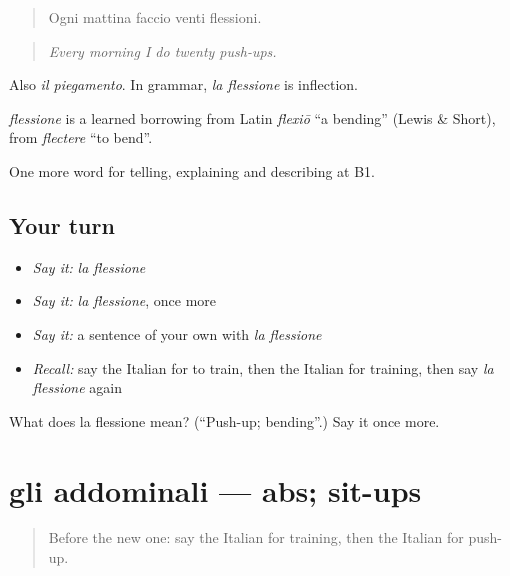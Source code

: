 \begin{quote}
Ogni mattina faccio venti flessioni.
\end{quote}

\begin{quote}
\emph{Every morning I do twenty push-ups.}
\end{quote}

Also \emph{il piegamento}. In grammar, \emph{la flessione} is inflection.

\begin{cousinweb}
\emph{flessione} is a learned borrowing from Latin \emph{flexiō} \textquotedblleft{}a bending\textquotedblright{} (Lewis \& Short), from \emph{flectere} \textquotedblleft{}to bend\textquotedblright{}.
\end{cousinweb}

\begin{grammarlens}[title={What you've built}]
One more word for telling, explaining and describing at B1.
\end{grammarlens}

\subsection*{Your turn}
\begin{itemize}
\raggedright
  \item \emph{Say it:} \emph{la flessione}
  \item \emph{Say it:} \emph{la flessione}, once more
  \item \emph{Say it:} a sentence of your own with \emph{la flessione}
  \item \emph{Recall:} say the Italian for to train, then the Italian for training, then say \emph{la flessione} again
\end{itemize}

\begin{tcolorbox}[breakable,colback=teal!4,colframe=teal!35!black,title={Before you move on}]
What does la flessione mean? (\textquotedblleft{}Push-up; bending\textquotedblright{}.) Say it once more.
\end{tcolorbox}
\section[gli addominali]{gli addominali — abs; sit-ups}

\label{lesson:IT-C508-addominali}



\begin{quote}
Before the new one: say the Italian for training, then the Italian for push-up.
\end{quote}

